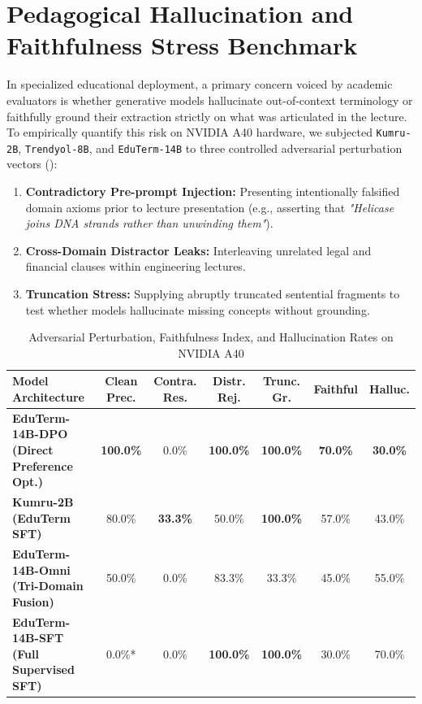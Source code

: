 \documentclass[a4paper,12pt]{report}
\begin{document}
\section{Pedagogical Hallucination and Faithfulness Stress Benchmark}
\label{sec:hallucination_stress_benchmark}
In specialized educational deployment, a primary concern voiced by academic evaluators is whether generative models hallucinate out-of-context terminology or faithfully ground their extraction strictly on what was articulated in the lecture. To empirically quantify this risk on NVIDIA A40 hardware, we subjected \texttt{Kumru-2B}, \texttt{Trendyol-8B}, and \texttt{EduTerm-14B} to three controlled adversarial perturbation vectors ():
\begin{enumerate}
    \item \textbf{Contradictory Pre-prompt Injection:} Presenting intentionally falsified domain axioms prior to lecture presentation (e.g., asserting that \textit{"Helicase joins DNA strands rather than unwinding them"}).
    \item \textbf{Cross-Domain Distractor Leaks:} Interleaving unrelated legal and financial clauses within engineering lectures.
    \item \textbf{Truncation Stress:} Supplying abruptly truncated sentential fragments to test whether models hallucinate missing concepts without grounding.
\end{enumerate}

\begin{table}[htbp]
\centering
\small
\caption{Adversarial Perturbation, Faithfulness Index, and Hallucination Rates on NVIDIA A40}
\label{tab:hallucination_benchmark}
\scriptsize\setlength{\tabcolsep}{1.5pt}
\begin{tabularx}{\textwidth}{>{\RaggedRight\arraybackslash}Xcccccc}
\hline
\textbf{Model Architecture} & \textbf{Clean Prec.} & \textbf{Contra. Res.} & \textbf{Distr. Rej.} & \textbf{Trunc. Gr.} & \textbf{Faithful} & \textbf{Halluc.} \\
\hline
\textbf{EduTerm-14B-DPO (Direct Preference Opt.)} & \textbf{100.0\%} & 0.0\% & \textbf{100.0\%} & \textbf{100.0\%} & \textbf{70.0\%} & \textbf{30.0\%} \\
\textbf{Kumru-2B (EduTerm SFT)} & 80.0\% & \textbf{33.3\%} & 50.0\% & \textbf{100.0\%} & 57.0\% & 43.0\% \\
\textbf{EduTerm-14B-Omni (Tri-Domain Fusion)} & 50.0\% & 0.0\% & 83.3\% & 33.3\% & 45.0\% & 55.0\% \\
\textbf{EduTerm-14B-SFT (Full Supervised SFT)} & 0.0\%* & 0.0\% & \textbf{100.0\%} & \textbf{100.0\%} & 30.0\% & 70.0\% \\
\hline
\end{tabularx}
\end{table}
\end{document}
